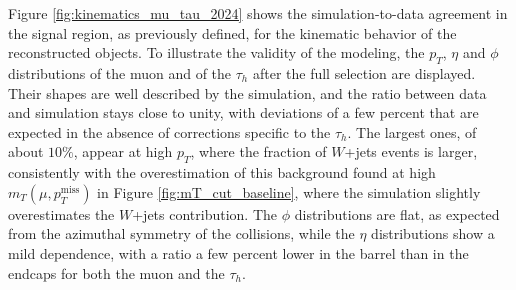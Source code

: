 Figure \ref{fig:kinematics_mu_tau_2024} shows the simulation-to-data agreement in the signal region, as previously defined, for the kinematic behavior of the reconstructed objects. To illustrate the validity of the modeling, the $p_T$, $\eta$ and $\phi$ distributions of the muon and of the $\tau_h$ after the full selection are displayed. Their shapes are well described by the simulation, and the ratio between data and simulation stays close to unity, with deviations of a few percent that are expected in the absence of corrections specific to the $\tau_h$. The largest ones, of about $10\%$, appear at high $p_T$, where the fraction of $W$+jets events is larger, consistently with the overestimation of this background found at high $m_T(\mu,p_T^\text{miss})$ in Figure \ref{fig:mT_cut_baseline}, where the simulation slightly overestimates the $W$+jets contribution. The $\phi$ distributions are flat, as expected from the azimuthal symmetry of the collisions, while the $\eta$ distributions show a mild dependence, with a ratio a few percent lower in the barrel than in the endcaps for both the muon and the $\tau_h$.
%
